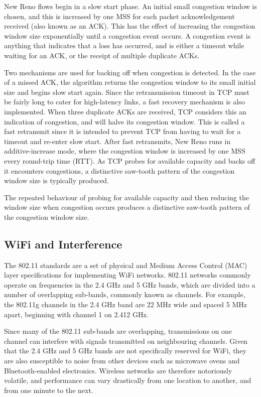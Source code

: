New Reno flows begin in a slow start phase. An initial small congestion window
is chosen, and this is increased by one MSS for each packet acknowledgement
received (also known as an ACK). This has the effect of increasing the
congestion window size exponentially until a congestion event occurs. A
congestion event is anything that indicates that a loss has occurred, and is
either a timeout while waiting for an ACK, or the receipt of multiple
duplicate ACKs.

Two mechanisms are used for backing off when congestion is detected. In the
case of a missed ACK, the algorithm returns the congestion window to its small
initial size and begins slow start again. Since the retransmission timeout in TCP
must be
fairly long to cater for high-latency links, a fast recovery mechanism is also
implemented. When three duplicate ACKs are received, TCP considers this an
indication of congestion, and will halve its congestion window. This is called a
fast retransmit since it is intended to prevent TCP from having to wait for a
timeout and re-enter slow start. After fast retransmits, New Reno runs in
additive-increase mode, where the congestion window is increased by one MSS
every round-trip time (RTT). As TCP probes for available capacity and backs off
it encounters congestions, a distinctive saw-tooth pattern of the congestion
window size is typically produced.

The repeated behaviour of probing for available capacity and then reducing the
window size when congestion occurs produces a distinctive saw-tooth pattern of
the congestion window size.

\subsection{WiFi and Interference}
\label{sec:bg:wifi}
The 802.11 standards are a set of physical and Medium Access Control (MAC) layer
specifications for
implementing WiFi networks. 802.11 networks commonly operate on frequencies in
the 2.4 GHz and 5 GHz bands, which are divided into a number of overlapping
sub-bands, commonly known as channels. For example, the 802.11g channels in
the 2.4 GHz band are 22 MHz wide and spaced 5 MHz apart, beginning with channel
1 on 2.412
GHz.

Since many of the 802.11 sub-bands are overlapping, transmissions on one channel
can interfere with signals transmitted on neighbouring channels. Given that the
2.4 GHz and 5 GHz bands are
not specifically reserved for WiFi, they are also susceptible to noise from
other devices such as microwave ovens and Bluetooth-enabled electronics.
Wireless networks are therefore notoriously volatile, and performance can vary
drastically from one location to another, and from one minute to the next.

